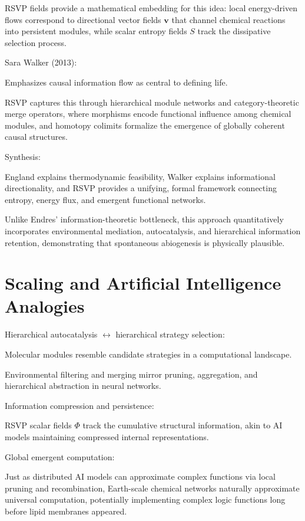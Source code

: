\documentclass{book}
\begin{document}
RSVP fields provide a mathematical embedding for this idea: local energy-driven flows correspond to directional vector fields $\mathbf{v}$ that channel chemical reactions into persistent modules, while scalar entropy fields $S$ track the dissipative selection process.

Sara Walker (2013):

Emphasizes causal information flow as central to defining life.

RSVP captures this through hierarchical module networks and category-theoretic merge operators, where morphisms encode functional influence among chemical modules, and homotopy colimits formalize the emergence of globally coherent causal structures.

Synthesis:

England explains thermodynamic feasibility, Walker explains informational directionality, and RSVP provides a unifying, formal framework connecting entropy, energy flux, and emergent functional networks.

Unlike Endres’ information-theoretic bottleneck, this approach quantitatively incorporates environmental mediation, autocatalysis, and hierarchical information retention, demonstrating that spontaneous abiogenesis is physically plausible.

\section{Scaling and Artificial Intelligence Analogies}
Hierarchical autocatalysis $\leftrightarrow$ hierarchical strategy selection:

Molecular modules resemble candidate strategies in a computational landscape.

Environmental filtering and merging mirror pruning, aggregation, and hierarchical abstraction in neural networks.

Information compression and persistence:

RSVP scalar fields $\Phi$ track the cumulative structural information, akin to AI models maintaining compressed internal representations.

Global emergent computation:

Just as distributed AI models can approximate complex functions via local pruning and recombination, Earth-scale chemical networks naturally approximate universal computation, potentially implementing complex logic functions long before lipid membranes appeared.
\end{document}
